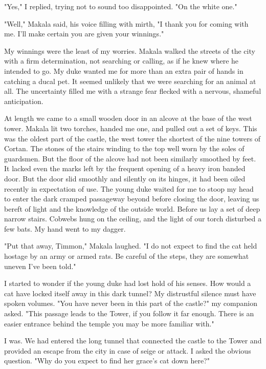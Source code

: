 \documentclass{article}
\begin{document}
"Yes," I replied, trying not to sound too disappointed. "On the white one."

"Well," Makala said, his voice filling with mirth, "I thank you for coming with me. I'll make certain you are given your winnings." 

My winnings were the least of my worries. Makala walked the streets of the city with a firm determination, not searching or calling, as if he knew where he intended to go. My duke wanted me for more than an extra pair of hands in catching a ducal pet. It seemed unlikely that we were searching for an animal at all. The uncertainty filled me with a strange fear flecked with a nervous, shameful anticipation.

At length we came to a small wooden door in an alcove at the base of the west tower. Makala lit two torches, handed me one, and pulled out a set of keys. This was the oldest part of the castle, the west tower the shortest of the nine towers of Cortan. The stones of the stairs winding to the top well worn by the soles of guardsmen. But the floor of the alcove had not been similarly smoothed by feet. It lacked even the marks left by the frequent opening of a heavy iron banded door. But the door slid smoothly and silently on its hinges, it had been oiled recently in expectation of use. The young duke waited for me to stoop my head to enter the dark cramped passageway beyond before closing the door, leaving us bereft of light and the knowledge of the outside world. Before us lay a set of deep narrow stairs. Cobwebs hung on the ceiling, and the light of our torch disturbed a few bats. My hand went to my dagger.

"Put that away, Timmon," Makala laughed. "I do not expect to find the cat held hostage by an army or armed rats. Be careful of the steps, they are somewhat uneven I've been told."

I started to wonder if the young duke had lost hold of his senses. How would a cat have locked itself away in this dark tunnel? My distrustful silence must have spoken volumes. "You have never been in this part of the castle?" my companion asked. "This passage leads to the Tower, if you follow it far enough. There is an easier entrance behind the temple you may be more familiar with."  

I was. We had entered the long tunnel that connected the castle to the Tower and provided an escape from the city in case of seige or attack. I asked the obvious question. "Why do you expect to find her grace's cat down here?"
\end{document}
